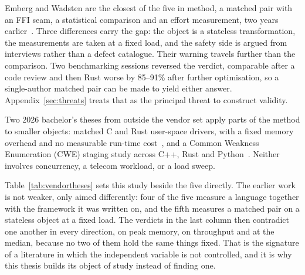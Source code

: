 \documentclass[english,oneside,a4paper,censored,csm,software-track-2020]{HYthesisML}
\begin{document}
\begin{appendices}
Emberg and Wadsten are the closest of the five in method, a matched pair with an FFI seam, a
statistical comparison and an effort measurement, two years earlier~\cite{emberg2023asn1}. Three
differences carry the gap: the object is a stateless transformation, the measurements are taken at
a fixed load, and the safety side is argued from interviews rather than a defect catalogue. Their
warning travels further than the comparison. Two benchmarking sessions reversed the verdict,
comparable after a code review and then Rust worse by 85--91\% after further optimisation, so a
single-author matched pair can be made to yield either answer. Appendix~\ref{sec:threats} treats
that as the principal threat to construct validity.

Two 2026 bachelor's theses from outside the vendor set apply parts of the method to smaller
objects: matched C and Rust user-space drivers, with a fixed memory overhead and no measurable
run-time cost~\cite{sundvisson2026drivers}, and a Common Weakness Enumeration (CWE) staging
study across C++, Rust and Python~\cite{andersson2026stdmemsafety}. Neither involves concurrency,
a telecom workload, or a load sweep.

Table~\ref{tab:vendortheses} sets this study beside the five directly. The earlier work is not
weaker, only aimed differently: four of the five measure a language together with the framework it
was written on, and the fifth measures a matched pair on a stateless object at a fixed load. The
verdicts in the last column then contradict one another in every direction, on peak memory, on
throughput and at the median, because no two of them hold the same things fixed. That is the
signature of a literature in which the independent variable is not controlled, and it is why this
thesis builds its object of study instead of finding one.


\end{appendices}
\end{document}
